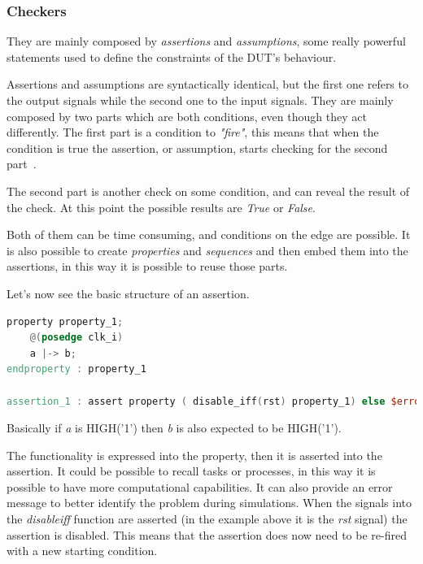 \subsubsection{Checkers}
They are mainly composed by \emph{assertions} and \emph{assumptions}, some really powerful statements used to deﬁne the constraints of the DUT’s behaviour.

Assertions and assumptions are syntactically identical, but the first one refers to the output signals while the second one to the input signals.
They are mainly composed by two parts which are both conditions, even though they act differently. The first part is a condition to \textit{"fire"}, this means that when the condition is true the assertion, or assumption, starts checking for the second part~\cite{verification-book-2016}.

The second part is another check on some condition, and can reveal the result of the check. At this point the possible results are \textit{True} or \textit{False}.

Both of them can be time consuming, and conditions on the edge are possible.
It is also possible to create \textit{properties} and \textit{sequences} and then embed them into the assertions, in this way it is possible to reuse those parts.

Let's now see the basic structure of an assertion.
\bigskip

\linespread{1}
\begin{lstlisting}[language=Verilog,style=verilog-style, backgroundcolor=\color{lyel_palette}, frame=tlb]
property property_1;
    @(posedge clk_i)
	a |-> b;
endproperty : property_1

assertion_1 : assert property ( disable_iff(rst) property_1) else $error("")

\end{lstlisting}
\linespread{1.2}
\bigskip

Basically if \emph{a} is HIGH('1') then \emph{b} is also expected to be HIGH('1').

The functionality is expressed into the property, then it is asserted into the assertion. It could be possible to recall tasks or processes, in this way it is possible to have more computational capabilities.
It can also provide an error message to better identify the problem during simulations.
When the signals into the \emph{disable\+iff} function are asserted (in the example above it is the \emph{rst} signal) the assertion is disabled. This means that the assertion does now need to be re-fired with a new starting condition.




